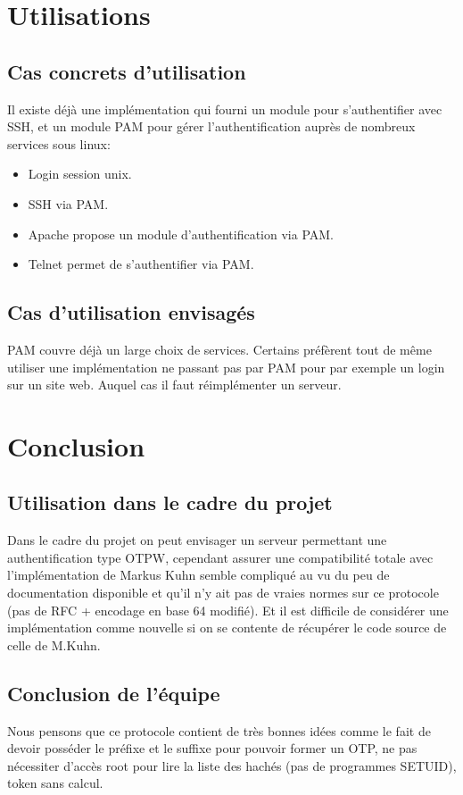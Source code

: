 \documentclass{../res/univ-projet}
\begin{document}
\section{Utilisations}
\subsection{Cas concrets d'utilisation}
        Il existe déjà une implémentation qui fourni un module pour s'authentifier avec SSH, 
    et un module PAM pour gérer l'authentification auprès de nombreux services sous linux:
    \begin{itemize}
     \item Login session unix.
     \item SSH via PAM.
     \item Apache propose un module d'authentification via PAM.
     \item Telnet permet de s'authentifier via PAM.
    \end{itemize}


\subsection{Cas d'utilisation envisagés}
        PAM couvre déjà un large choix de services. Certains préfèrent tout de même utiliser une implémentation
    ne passant pas par PAM pour par exemple un login sur un site web. Auquel cas il faut réimplémenter un serveur.

\section{Conclusion}
\subsection{Utilisation dans le cadre du projet}
        Dans le cadre du projet on peut envisager un serveur permettant une authentification type OTPW, cependant
    assurer une compatibilité totale avec l'implémentation de Markus Kuhn semble compliqué au vu du peu de documentation
    disponible et qu'il n'y ait pas de \og vraies\fg{} normes sur ce protocole (pas de RFC + encodage en base 64 modifié).
    Et il est difficile de considérer une implémentation comme nouvelle si on se contente de récupérer le code source
    de celle de M.Kuhn.

\subsection{Conclusion de l'équipe}
        Nous pensons que ce protocole contient de très bonnes idées comme le fait de devoir posséder le préfixe et
    le suffixe pour pouvoir former un OTP, ne pas nécessiter d'accès root pour lire la liste des hachés (pas de
    programmes SETUID), token sans calcul.
    
\end{document}
